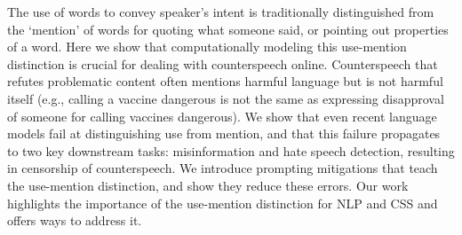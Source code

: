 The use of words to convey speaker's intent is traditionally distinguished from the  `mention' of words for quoting what someone said, or pointing out properties of a word.  Here we show that computationally modeling this use-mention distinction is crucial for dealing with counterspeech online.  Counterspeech that refutes problematic content often mentions harmful language but is not harmful itself (e.g., calling a vaccine dangerous is not the same as expressing disapproval of someone for calling vaccines dangerous). We show that even recent language models fail at distinguishing use from mention, and that this failure propagates to two key downstream tasks: misinformation and hate speech detection, resulting in censorship of counterspeech.  We introduce prompting mitigations that teach the use-mention distinction, and show they reduce these errors.  Our work highlights the importance of the use-mention distinction for NLP and CSS and offers ways to address it.